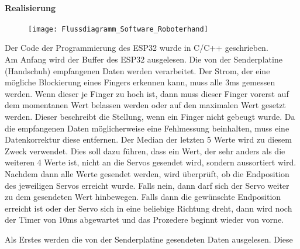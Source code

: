 \documentclass[titlepage,12pt,twoside]{article}
\begin{document}
\paragraph{Realisierung}
\hfill \break
\hfill \break
\begin{figure}[H]
	\begin{center}
		\scalebox{0.5}
		{\texttt{[image: Flussdiagramm\_Software\_Roboterhand]}}
	\end{center}
\end{figure}
\hfill \break
Der Code der Programmierung des ESP32 wurde in C/C++ geschrieben. \\
Am Anfang wird der Buffer des ESP32 ausgelesen. Die von der Senderplatine (Handschuh) empfangenen Daten werden verarbeitet. 
Der Strom, der eine mögliche Blockierung eines Fingers erkennen kann, muss alle 3ms gemessen werden. Wenn dieser je Finger zu 
hoch ist, dann muss dieser Finger vorerst auf dem momentanen Wert belassen werden oder auf den maximalen Wert gesetzt werden. 
Dieser beschreibt die Stellung, wenn ein Finger nicht gebeugt wurde. Da die empfangenen Daten möglicherweise eine Fehlmessung 
beinhalten, muss eine Datenkorrektur diese entfernen. Der Median der letzten 5 Werte wird zu diesem Zweck verwendet. Dies soll 
dazu führen, dass ein Wert, der sehr anders als die weiteren 4 Werte ist, nicht an die Servos gesendet wird, sondern aussortiert 
wird. Nachdem dann alle Werte gesendet werden, wird überprüft, ob die Endposition des jeweiligen Servos erreicht wurde. Falls 
nein, dann darf sich der Servo weiter zu dem gesendeten Wert hinbewegen. Falls dann die gewünschte Endposition erreicht ist 
oder der Servo sich in eine beliebige Richtung dreht, dann wird noch der Timer von 10ms abgewartet und das Prozedere beginnt 
wieder von vorne.
\\
\begin{figure}[H]
	\centering
\end{figure}
\begin{figure}[H]
	\centering
\end{figure}
\begin{figure}[H]
	\centering
\end{figure}
\hfill \break
Als Erstes werden die von der Senderplatine gesendeten Daten ausgelesen. Diese 
\end{document}
